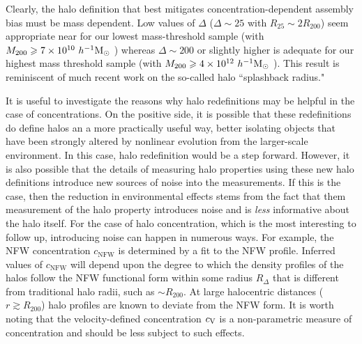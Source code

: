 \documentclass[usenatbib]{mnras}
\begin{document}
Clearly, the halo definition that best mitigates 
concentration-dependent assembly bias must be mass dependent. Low 
values of $\Delta$ ($\Delta \sim 25$ with $R_{25} \sim 2R_{200}$) seem appropriate near for our lowest 
mass-threshold sample (with $M_{200} \geqslant 7 \times 10^{10} \ h^{-1}\mathrm{M}_{\odot}~$) whereas $\Delta \sim 200$ or slightly higher
is adequate for our highest mass threshold sample (with $M_{200} \geqslant 4 \times 10^{12} \ h^{-1}\mathrm{M}_{\odot}~$). This result is
reminiscent of much recent work on the so-called halo ``splashback radius."\citep{more_etal15} 




It is useful to investigate the reasons why halo redefinitions may be helpful in the case 
of concentrations. On the positive side, it is possible that these redefinitions do define 
halos an a more practically useful way, better isolating objects that have been strongly 
altered by nonlinear evolution from the larger-scale environment. In this case, halo redefinition 
would be a step forward. However, it is also possible that the details of measuring halo 
properties using these new halo definitions introduce new sources of noise into the 
measurements. If this is the case, then the reduction in environmental effects stems 
from the fact that them measurement of the halo property 
introduces noise and is {\em less} informative about the halo itself. 
For the case of halo concentration, which is the most interesting to 
follow up, introducing noise can happen in numerous ways. For example, 
the NFW concentration $c_{\mathrm{NFW}}$ is determined by a fit to the 
NFW profile. Inferred values of $c_{\mathrm{NFW}}$ will depend upon 
the degree to which the density profiles of the halos follow the NFW 
functional form within some radius $R_{\Delta}$ that is different from 
traditional halo radii, such as $\sim R_{200}$. At large halocentric 
distances ($r \gtrsim R_{200}$) halo profiles are known to deviate 
from the NFW form. It is worth noting that the velocity-defined concentration 
$c_{\rm V}$ is a non-parametric measure of concentration and should be 
less subject to such effects. 
\end{document}

